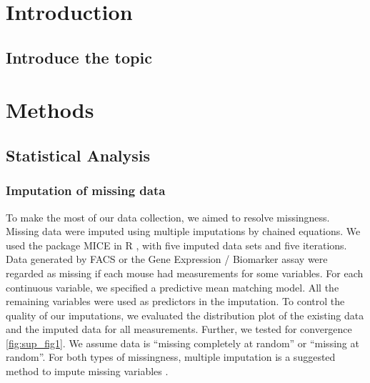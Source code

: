 \documentclass[webpdf,large,contemporary,namedate]{oup-authoring-template}
\theoremstyle{thmstyleone}
\theoremstyle{thmstyletwo}
\theoremstyle{thmstylethree}
\begin{document}


\maketitle


\hypertarget{introduction}{%
\section{Introduction}\label{introduction}}

\hypertarget{introduce-the-topic}{%
\subsection{Introduce the topic}\label{introduce-the-topic}}

\hypertarget{methods}{%
\section{Methods}\label{methods}}

\hypertarget{statistical-analysis}{%
\subsection{Statistical Analysis}\label{statistical-analysis}}

\hypertarget{imputation-of-missing-data}{%
\subsubsection{Imputation of missing
data}\label{imputation-of-missing-data}}

To make the most of our data collection, we aimed to resolve
missingness. Missing data were imputed using multiple imputations by
chained equations. We used the package MICE in R \citet{van2011mice},
with five imputed data sets and five iterations. Data generated by FACS
or the Gene Expression / Biomarker assay were regarded as missing if
each mouse had measurements for some variables. For each continuous
variable, we specified a predictive mean matching model. All the
remaining variables were used as predictors in the imputation. To
control the quality of our imputations, we evaluated the distribution
plot of the existing data and the imputed data for all measurements.
Further, we tested for convergence \ref{fig:sup_fig1}. We assume data is
``missing completely at random'' or ``missing at random''. For both
types of missingness, multiple imputation is a suggested method to
impute missing variables \citet{van2018flexible}.
\end{document}

